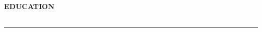\begin{center}
\textbf{EDUCATION}
\end{center}

\vspace{\sectionTitleSpacing}

\begin{longtable}{p{}p{}}


\end{longtable}

\vspace{\sectionSeparatorSpacing}
\rule{\textwidth}{}
\vspace{\sectionSeparatorSpacing} 